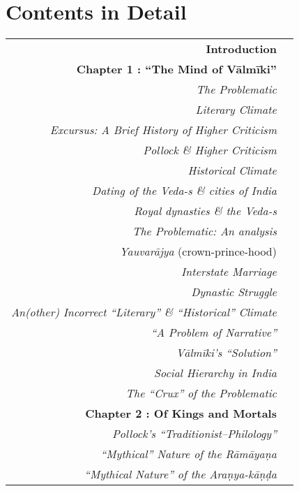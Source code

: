 \chapter{Contents in Detail}
\label{cid}

{\renewcommand{\arraystretch}{1.25}
\begin{longtable}[r]{rr@{}}
{\bf Introduction} & \pageref{introduction}\\[7pt]
{\hfill\bfseries Chapter 1 : “The Mind of Vālmīki”} & \hfill\pageref{chapter1}\\
{\sl The Problematic} & \pageref{sec1.1}\\
{\sl Literary Climate} & \pageref{sec1.1.1}\\
{\sl Excursus: A   Brief History of Higher Criticism} & \pageref{sec1.1.1.1}\\
{\sl Pollock \& Higher Criticism} & \pageref{sec1.1.1.2}\\
{\sl Historical Climate} & \pageref{sec1.1.2}\\
{\sl Dating of the Veda-s \& cities of India} & \pageref{sec1.1.2.1}\\
{\sl Royal dynasties \& the Veda-s} & \pageref{sec1.1.2.3}\\
{\sl The Problematic: An analysis} & \pageref{sec1.2}\\
{\sl Yauvarājya} (crown-prince-hood) & \pageref{sec1.2.1}\\
{\sl Interstate Marriage} & \pageref{sec1.2.2}\\
{\sl Dynastic Struggle} & \pageref{sec1.2.3}\\
{\sl An(other) Incorrect “Literary” \& “Historical” Climate} & \pageref{sec1.2.3.1}\\
{\sl “A Problem of Narrative”} & \pageref{sec1.2.3.2}\\
{\sl Vālmīki’s “Solution”} & \pageref{sec1.3}\\
{\sl Social Hierarchy in India} & \pageref{sec1.3.1}\\
{\sl The “Crux” of the Problematic} & \pageref{sec1.4}\\[7pt]
{\hfill\bfseries Chapter 2 : Of Kings and Mortals} & \hfill\pageref{chapter2}\\
{\sl Pollock’s “Traditionist–Philology”} & \pageref{sec2.1}\\
{\sl “Mythical” Nature of the  Rāmāyaṇa} & \pageref{sec2.2}\\
{\sl “Mythical Nature” of the Araṇya-kāṇḍa} & \pageref{sec2.3}\\

\end{longtable}}
